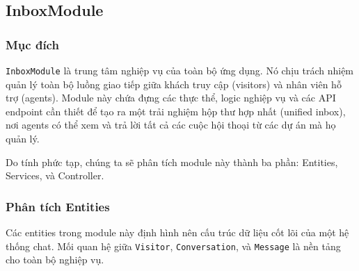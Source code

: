 \subsection{InboxModule}
\label{subsec:inbox-module}

\subsubsection{Mục đích}

\texttt{InboxModule} là trung tâm nghiệp vụ của toàn bộ ứng dụng. Nó chịu trách nhiệm quản lý toàn bộ luồng giao tiếp giữa khách truy cập (visitors) và nhân viên hỗ trợ (agents). Module này chứa đựng các thực thể, logic nghiệp vụ và các API endpoint cần thiết để tạo ra một trải nghiệm hộp thư hợp nhất (unified inbox), nơi agents có thể xem và trả lời tất cả các cuộc hội thoại từ các dự án mà họ quản lý.

Do tính phức tạp, chúng ta sẽ phân tích module này thành ba phần: Entities, Services, và Controller.

\subsubsection{Phân tích Entities}
\label{subsubsec:inbox-entities}

Các entities trong module này định hình nên cấu trúc dữ liệu cốt lõi của một hệ thống chat. Mối quan hệ giữa \texttt{Visitor}, \texttt{Conversation}, và \texttt{Message} là nền tảng cho toàn bộ nghiệp vụ.

